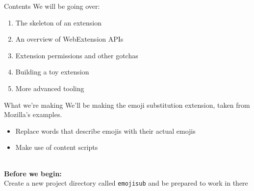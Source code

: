 \documentclass[../index.tex]{subfiles}
\begin{document}

\renewcommand{\currenttitle}{Contents}
\begin{frame}{\currenttitle}
  We will be going over:
  \begin{enumerate}
    \item The skeleton of an extension
    \item An overview of WebExtension APIs
    \item Extension permissions and other gotchas
    \item Building a toy extension
    \item More advanced tooling
  \end{enumerate}
\end{frame}

\renewcommand{\currenttitle}{What we're making}
\begin{frame}[fragile]{\currenttitle}
  We'll be making the emoji substitution extension, taken from Mozilla's
  examples.

  \begin{itemize}
    \item Replace words that describe emojis with their actual emojis
    \item Make use of content scripts
  \end{itemize}

  \\[2em]

  \textbf{Before we begin:} \\
  Create a new project directory called \texttt{emojisub} and be prepared to
  work in there

\end{frame}

\end{document}
